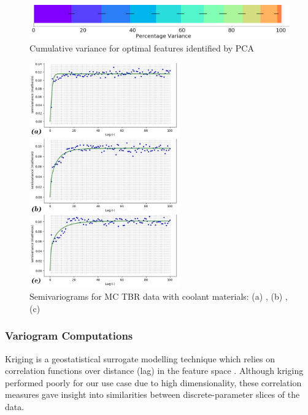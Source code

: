 \begin{figure}[h]
  \centering
    \includegraphics[width=0.6\linewidth]{fig2_pca.jpg}
    \caption{Cumulative variance for optimal features identified by PCA}
  \label{fig:pca}
\end{figure}

\begin{figure}
  \vspace{-30pt}
  \begin{center}
    \hspace*{-.3\columnsep}\includegraphics[width=0.58\textwidth]{fig3_allvar.jpg}
	\caption{Semivariograms for MC TBR data with coolant materials: (a) ,
	(b) , (c) }
    \label{fig:var}
  \end{center}
  \vspace{-50pt}
\end{figure}

\subsubsection{Variogram Computations}

Kriging is a geostatistical surrogate modelling technique which relies on
correlation functions over distance (lag) in the feature space \cite{Bouhlel2018}. Although kriging performed poorly for our use case due to high dimensionality, these correlation measures gave insight into similarities between discrete-parameter slices of the data.

